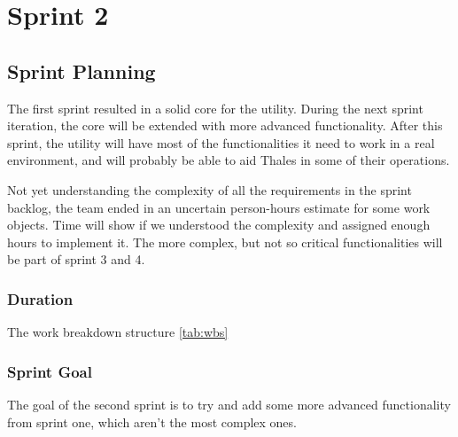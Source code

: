 \chapter{Sprint 2}


\section{Sprint Planning}
The first sprint resulted in a solid core for the utility. During the next sprint iteration, the core will be extended with more advanced functionality. After this sprint, the utility will have most of the functionalities it need to work in a real environment, and will probably be able to aid Thales in some of their operations.

Not yet understanding the complexity of all the requirements in the sprint backlog, the team ended in an uncertain person-hours estimate for some work objects. Time will show if we understood the complexity and assigned enough hours to implement it. The more complex, but not so critical functionalities will be part of sprint 3 and 4.   



\subsection{Duration}
The work breakdown structure \autoref{tab:wbs}

\subsection{Sprint Goal}
The goal of the second sprint is to try and add some more advanced
functionality from sprint one, which aren't the most complex ones.

